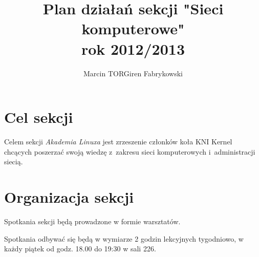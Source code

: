 \documentclass[a4paper,12pt]{article}
\title{Plan działań sekcji "Sieci komputerowe"\\rok 2012/2013}
\author{Marcin TORGiren Fabrykowski}
\begin{document}
\maketitle
\newpage
\section{Cel sekcji}
Celem sekcji \textit{Akademia Linuxa} jest zrzeszenie członków koła KNI Kernel chcących poszerzać swoją wiedzę z~zakresu sieci komputerowych i~administracji siecią.
\section{Organizacja sekcji}
Spotkania sekcji będą prowadzone w formie warsztatów.

Spotkania odbywać się będą w wymiarze 2 godzin lekcyjnych tygodniowo, w każdy piątek od godz. 18.00 do 19:30 w sali 226.
\end{document}
